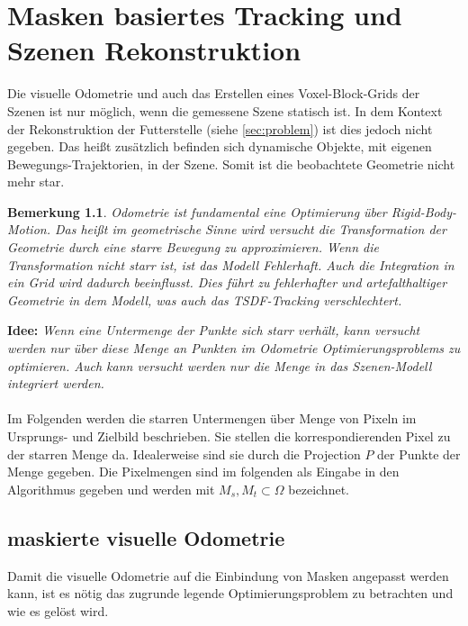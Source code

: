 \documentclass[12pt,DIV=15,BCOR=15mm,twoside,headsepline,abstract=true,listof=totoc,bibliography=totoc]{scrreprt}
\newtheorem{remark}{Bemerkung}[chapter]
\theoremstyle{remark}    %
\begin{document}
    \chapter{Masken basiertes Tracking und Szenen Rekonstruktion}
    Die visuelle Odometrie und auch das Erstellen eines Voxel-Block-Grids der Szenen ist nur möglich, wenn die gemessene Szene statisch ist. 
    In dem Kontext der Rekonstruktion der Futterstelle (siehe \ref{sec:problem}) ist dies jedoch nicht gegeben. Das heißt zusätzlich befinden sich dynamische Objekte, 
    mit eigenen Bewegungs-Trajektorien, in der Szene. Somit ist die beobachtete Geometrie nicht mehr star.
    \begin{remark}
    Odometrie ist fundamental eine Optimierung über Rigid-Body-Motion. Das heißt im geometrische Sinne wird versucht die Transformation
    der Geometrie durch eine starre Bewegung zu approximieren. Wenn die Transformation nicht starr ist, ist das Modell Fehlerhaft. Auch die Integration 
    in ein Grid wird dadurch beeinflusst. Dies führt zu fehlerhafter und artefalthaltiger Geometrie in dem Modell, was auch das \ac{TSDF}-Tracking verschlechtert.
    \end{remark} \noindent
    \textbf{Idee:} \emph{Wenn eine Untermenge der Punkte sich starr verhält, kann versucht werden nur über diese Menge an Punkten im Odometrie 
    Optimierungsproblems zu optimieren. Auch kann versucht werden nur die Menge in das Szenen-Modell integriert werden.}\\\\
    Im Folgenden werden die starren Untermengen über Menge von Pixeln im Ursprungs- und Zielbild beschrieben. Sie stellen die korrespondierenden Pixel zu der 
    starren Menge da. Idealerweise sind sie durch die Projection $P$ der Punkte der Menge gegeben. Die Pixelmengen sind im folgenden  als Eingabe in 
    den Algorithmus gegeben und werden mit $M_s, M_t \subset \Omega$ bezeichnet.

    \section{maskierte visuelle Odometrie}
    Damit die visuelle Odometrie auf die Einbindung von Masken angepasst werden kann, ist es nötig das zugrunde legende Optimierungsproblem zu betrachten und 
    wie es gelöst wird.
\end{document}
